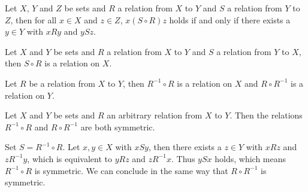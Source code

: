 \begin{remarks}
    \begin{remarkenumerate}
        \item Let $X$, $Y$ and $Z$ be sets and $R$ a relation from $X$ to $Y$ and $S$ a relation from $Y$ to $Z$, then for all $x\in X$ and $z\in Z$, $x (S\circ R) z$ holds if and only if there exists a $y\in Y$ with $x R y$ and $y S z$.
        \item Let $X$ and $Y$ be sets and $R$ a relation from $X$ to $Y$ and $S$ a relation from $Y$ to $X$, then $S\circ R$ is a relation on $X$.
        \item Let $R$ be a relation from $X$ to $Y$, then $R^{-1}\circ R$ is a relation on $X$ and $R\circ R^{-1}$ is a relation on $Y$.
        \item\label{example:relations:composition_with_its_inverse} Let $X$ and $Y$ be sets and $R$ an arbitrary relation from $X$ to $Y$. Then the relations $R^{-1}\circ R$ and $R\circ R^{-1}$ are both symmetric.
        \begin{miniproof}
            Set $S=R^{-1}\circ R$. Let $x,y\in X$ with $x S y$, then there exists a $z\in Y$ with $x R z$ and $z R^{-1} y$, which is equivalent to $y R z$ and $z R^{-1} x$. Thus $y S x$ holds, which means $R^{-1}\circ R$ is symmetric. We can conclude in the same way that $R\circ R^{-1}$ is symmetric.
        \end{miniproof}
    \end{remarkenumerate}
\end{remarks}

